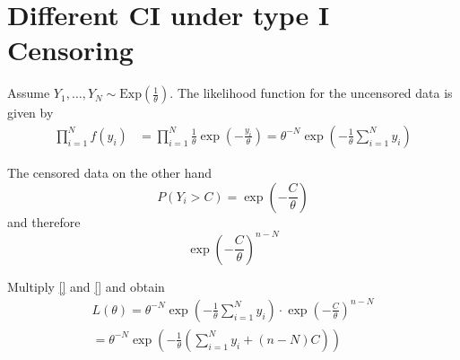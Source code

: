 \chapter*{Different CI under type I Censoring}


Assume $Y_1, \ldots , Y_N \sim \text{Exp} \left(\frac{1}{\theta} \right)$. The likelihood function for the uncensored data is given by
\begin{align*}
    \prod_{i=1}^N f(y_i) &= \prod_{i=1}^N \frac{1}{\theta} \exp\left( - \frac{y_i}{\theta} \right) = 
    \theta^{-N} 
    \exp\left( - \frac{1}{\theta}  \sum_{i=1}^N  y_i \right)
\end{align*}

The censored data on the other hand 
\[
    P(Y_i > C) = \exp \left(- \frac{C}{\theta} \right)
\]
and therefore 
\[
    \exp \left(- \frac{C}{\theta} \right)^{n-N} 
\]

Multiply \eqref{} and \eqref{} and obtain
\begin{align*}
    L(\theta) 
    =
    \theta^{-N} 
    \exp\left( - \frac{1}{\theta}  \sum_{i=1}^N  y_i \right) \cdot 
    \exp \left(- \frac{C}{\theta} \right)^{n-N} 
    \\
    =
    \theta^{-N} 
    \exp\left( - \frac{1}{\theta} 
    \left( 
    \sum_{i=1}^N  y_i 
    + (n-N)C
    \right)\right) 
\end{align*}
